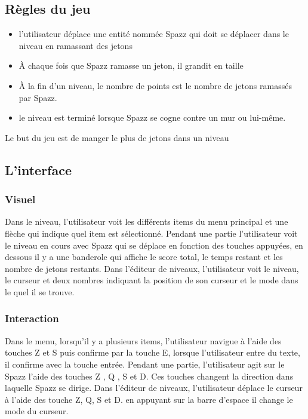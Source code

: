 \documentclass[a4paper,11pt]{scrartcl}
\begin{document}
\subsection{Règles du jeu}
\begin{itemize}[label = $\bullet$]
	\item l'utilisateur déplace une entité nommée Spazz qui doit se déplacer dans le niveau en ramassant des jetons
	\item À chaque fois que Spazz ramasse un jeton, il grandit en taille
	\item À la fin d'un niveau, le nombre de points est le nombre de jetons ramassés par Spazz.
    \item le niveau est terminé lorsque Spazz se cogne contre un mur ou lui-même.
\end{itemize}

Le but du jeu est de manger le plus de jetons dans un niveau

\subsection{L'interface}

\subsubsection{Visuel}
Dans le niveau, l'utilisateur voit les différents items du menu principal et une flèche qui indique quel item est sélectionné.
Pendant une partie l'utilisateur voit le niveau en cours avec Spazz qui se déplace en fonction des touches appuyées, en dessous il y a une banderole qui affiche le score total, le temps restant et les nombre de jetons restants.
Dans l'éditeur de niveaux, l'utilisateur voit le niveau, le curseur et deux nombres indiquant la position de son curseur et le mode dans le quel il se trouve.

\subsubsection{Interaction}
Dans le menu, lorsqu'il y a plusieurs items, l'utilisateur navigue à l'aide des touches Z et S puis confirme par la touche E, lorsque l'utilisateur entre du texte, il confirme avec la touche entrée.
Pendant une partie, l'utilisateur agit sur le Spazz l'aide des touches Z , Q , S et D. Ces touches changent la direction dans laquelle Spazz se dirige.
Dans l'éditeur de niveaux, l'utilisateur déplace le curseur à l'aide des touche Z, Q, S et D. en appuyant sur la barre d'espace il change le mode du curseur.
\end{document}
